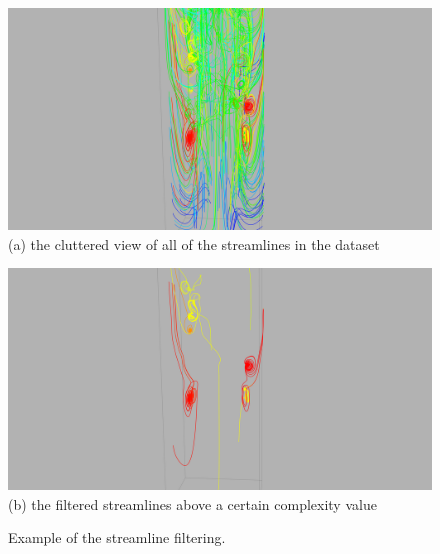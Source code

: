 \documentclass[journal]{vgtc}                %
\begin{document}
\begin{figure}[t]
	\centering
		\begin{minipage}{0.45\linewidth}
			\centering \small
			\includegraphics[height = 0.7\linewidth]{all.png}\\(a) the cluttered view of all of the streamlines in the dataset\vspace{0.2em}
		\end{minipage}
		\begin{minipage}{0.45\linewidth}
			\centering \small
			\includegraphics[height = 0.7\linewidth]{filtered.png}\\(b) the filtered streamlines above a certain complexity value \vspace{0.2em}
		\end{minipage}
	\caption{Example of the streamline filtering.}
	\label{fig:value_filter}
\end{figure}
\end{document}
